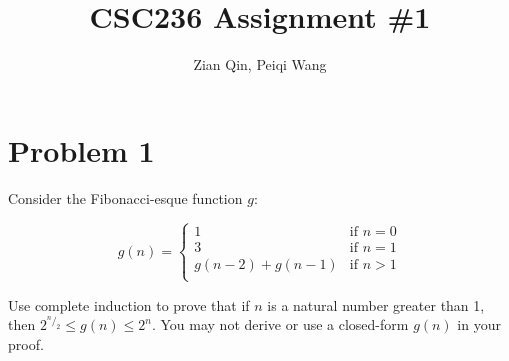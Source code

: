 \documentclass[11pt]{article}
\title{CSC236 Assignment \#1}
\author{Zian Qin, Peiqi Wang}
\theoremstyle{plain}%
\theoremstyle{definition}
\theoremstyle{remark}
\newcommand*\rfrac[2]{{}^{#1}\!/_{#2}}
\begin{document}
\maketitle


\section*{Problem 1}
Consider the Fibonacci-esque function $g$:

\[
  g(n) =
  \begin{cases}
    1 &\text{if $n=0$}\\
    3 &\text{if $n=1$}\\
    g(n-2) + g(n-1) &\text{if $n>1$}\\
  \end{cases}
\]

Use complete induction to prove that if $n$ is a natural number greater than 1, then $2^{\rfrac{n}{2}} \leq g(n) \leq 2^n$. You may not derive or use a closed-form $g(n)$ in your proof.
\end{document}
